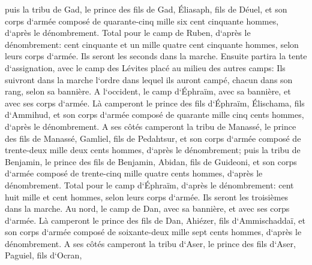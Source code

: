 \verse puis la tribu de Gad, le prince des fils de Gad, Éliasaph, fils de Déuel, 
\verse et son corps d`armée composé de quarante-cinq mille six cent cinquante hommes, d`après le dénombrement. 
\verse Total pour le camp de Ruben, d`après le dénombrement: cent cinquante et un mille quatre cent cinquante hommes, selon leurs corps d`armée. Ils seront les seconds dans la marche. 
\verse Ensuite partira la tente d`assignation, avec le camp des Lévites placé au milieu des autres camps: Ils suivront dans la marche l`ordre dans lequel ils auront campé, chacun dans son rang, selon sa bannière. 
\verse A l`occident, le camp d`Éphraïm, avec sa bannière, et avec ses corps d`armée. Là camperont le prince des fils d`Éphraïm, Élischama, fils d`Ammihud, 
\verse et son corps d`armée composé de quarante mille cinq cents hommes, d`après le dénombrement. 
\verse A ses côtés camperont la tribu de Manassé, le prince des fils de Manassé, Gamliel, fils de Pedahtsur, 
\verse et son corps d`armée composé de trente-deux mille deux cents hommes, d`après le dénombrement; 
\verse puis la tribu de Benjamin, le prince des fils de Benjamin, Abidan, fils de Guideoni, 
\verse et son corps d`armée composé de trente-cinq mille quatre cents hommes, d`après le dénombrement. 
\verse Total pour le camp d`Éphraïm, d`après le dénombrement: cent huit mille et cent hommes, selon leurs corps d`armée. Ils seront les troisièmes dans la marche. 
\verse Au nord, le camp de Dan, avec sa bannière, et avec ses corps d`armée. Là camperont le prince des fils de Dan, Ahiézer, fils d`Ammischaddaï, 
\verse et son corps d`armée composé de soixante-deux mille sept cents hommes, d`après le dénombrement. 
\verse A ses côtés camperont la tribu d`Aser, le prince des fils d`Aser, Paguiel, fils d`Ocran, 
